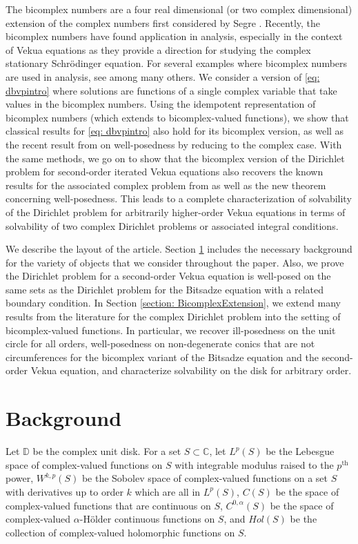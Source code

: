 \documentclass[12pt,reqno]{amsart}
\theoremstyle{definition}
\theoremstyle{remark}
\newcommand{\disk}{\mathbb{D}}
\begin{document}
    The bicomplex numbers are a four real dimensional (or two complex dimensional) extension of the complex numbers first considered by Segre \cite{Segre}. Recently, the bicomplex numbers have found application in analysis, especially in the context of Vekua equations as they provide a direction for studying the complex stationary Schr\"odinger equation. For several examples where bicomplex numbers are used in analysis, see \cite{ComplexSchr, CastaKrav, FundBicomplex, BCTransmutation, BCBergman, BCAtomic, BCHoiv, BCHarmVek, BCSchwarz, BCBeltrami} among many others. We consider a version of \eqref{eq: dbvpintro} where solutions are functions of a single complex variable that take values in the bicomplex numbers. Using the idempotent representation of bicomplex numbers (which extends to bicomplex-valued functions), we show that classical results for \eqref{eq: dbvpintro} also hold for its bicomplex version, as well as the recent result from \cite{Dirichletbianalytic} on well-posedness by reducing to the complex case. With the same methods, we go on to show that the bicomplex version of the Dirichlet problem for second-order iterated Vekua equations also recovers the known results for the associated complex problem from \cite{WBD2} as well as the new theorem concerning well-posedness. This leads to a complete characterization of solvability of the Dirichlet problem for arbitrarily higher-order Vekua equations in terms of solvability of two complex Dirichlet problems or associated integral conditions. 


    We describe the layout of the article. Section \ref{section: background} includes the necessary background for the variety of objects that we consider throughout the paper. Also, we prove the Dirichlet problem for a second-order Vekua equation is well-posed on the same sets as the Dirichlet problem for the Bitsadze equation with a related boundary condition. In Section \ref{section: BicomplexExtension}, we extend many results from the literature for the complex Dirichlet problem into the setting of bicomplex-valued functions. In particular, we recover ill-posedness on the unit circle for all orders, well-posedness on non-degenerate conics that are not circumferences for the bicomplex variant of the Bitsadze equation and the second-order Vekua equation, and characterize solvability on the disk for arbitrary order. 


\section{Background}\label{section: background}
    Let $\disk$ be the complex unit disk. For a set $S \subset \mathbb{C}$, let $L^p(S)$ be the Lebesgue space of complex-valued functions on $S$ with integrable modulus raised to the $p^{\text{th}}$ power, $W^{k,p}(S)$ be the Sobolev space of complex-valued functions on a set $S$ with derivatives up to order $k$ which are all in $L^p(S)$, $C(S)$ be the space of complex-valued functions that are continuous on $S$, $C^{0,\alpha}(S)$ be the space of complex-valued $\alpha$-H\"older continuous functions on $S$, and $Hol(S)$ be the collection of complex-valued holomorphic functions on $S$. 
\end{document}
